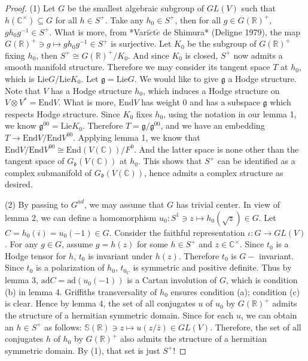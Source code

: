 \begin{proof}
(1) Let $G$ be the smallest algebraic subgroup of $GL(V)$ such that $h(\mathbb C^ \times) \subseteq G$ for all $h \in S^+$.  Take any $h_0 \in S^+$, then for all $g \in G(\mathbb R)^+$, $gh_0g^{-1}\in S^+$. What is more, from *Vari$\acute e$t$\acute e$ de Shimura* (Deligne 1979), the map $G(\mathbb R)^+ \ni g\mapsto gh_0g^{-1} \in S^+$ is surjective. Let $K_0$ be the subgroup of $G(\mathbb R)^+$ fixing $h_0$, then $S^+ \cong G(\mathbb R)^+/K_0$. And since $K_0$ is closed, $S^+$ now admits a smooth manifold structure. Therefore we may consider its tangent space $T$ at $h_0$, which is $\text{Lie}G/\text{Lie}K_0$. Let $\mathfrak g=\text{Lie}G$. We would like to give $\mathfrak g$ a Hodge structure. Note that $V$ has a Hodge structure $h_0$, which induces a Hodge structure on $V\otimes V ^* =\text{End}V$. What is more, $\text{End}V$ has weight 0 and has a subspace $\mathfrak g$ which respects Hodge structure. Since $K_0$ fixes $h_0$, using the notation in our lemma 1, we know $\mathfrak g ^{00}=\text{Lie}K_0$. Therefore $T=\mathfrak g /\mathfrak g ^{00}$, and we have an embedding $T \to \text{End}V/\text{End}V^{00}$. Applying lemma 1, we know that $\text{End}V/\text{End}V^{00} \cong \text{End}(V(\mathbb C))/F^0$. And the latter space is none other than the tangent space of $G_ \mathfrak d(V(\mathbb C))$ at $h_0$. This shows that $S^+$ can be identified as a complex submanifold of $G_ \mathfrak d(V(\mathbb C))$, hence admits a complex structure as desired.

(2) By passing to $G^{ad}$, we may assume that $G$ has trivial center. In view of lemma 2, we can define a homomorphism $u_0:S^1 \ni z\mapsto h_0(\sqrt z) \in G$. Let $C=h_0(i)=u_0(-1)\in G$.  Consider the faithful representation $\iota: G \to GL(V)$. For any $g\in G$, assume $g=h(z)$ for some $h\in S^+$ and $z\in \mathbb C^ \times$. Since $t_0$ is a Hodge tensor for $h$, $t_0$ is invariant under $h(z)$. Therefore $t_0$ is $G-$ invariant.  Since $t_0$ is a polarization of $h_0$, $t_{0_C}$ is symmetric and positive definite. Thus by lemma 3, $\text{ad}C=\text{ad}(u_0(-1))$ is a Cartan involution of $G$, which is condition (b) in lemma 4. Griffiths transversality of $h_0$ ensures condition (a); condition (c) is clear. Hence by lemma 4, the set of all conjugates $u$ of $u_0$ by $G(\mathbb R)^+$ admits the structure of a hermitian symmetric domain.  Since for each $u$, we can obtain an $h\in S^+$ as follows: $\mathbb S(\mathbb R) \ni z  \mapsto u(z/\bar z)\in GL(V)$. Therefore, the set of all conjugates $h$ of $h_0$ by $G(\mathbb R)^+$ also admits the structure of a hermitian symmetric domain. By (1), that set is just $S^+$!


\end{proof}
